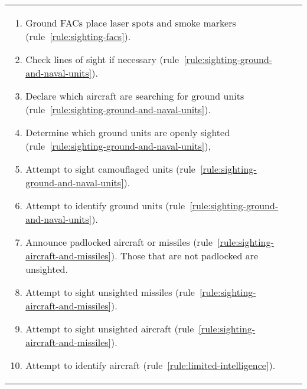 \begin{twocolumntable}
\begin{tabularx}{1.0\linewidth}{L@{\hspace{\columnsep}}L}
{\begin{enumerate}[topsep=0pt]
\begin{enumerate}[nosep]
    \item Ground FACs place laser spots and smoke markers (rule~\ref{rule:sighting-facs}).
    \item Check lines of sight if necessary (rule~\ref{rule:sighting-ground-and-naval-units}).
    \item Declare which aircraft are searching for ground units (rule~\ref{rule:sighting-ground-and-naval-units}).
    \item Determine which ground units are openly sighted (rule~\ref{rule:sighting-ground-and-naval-units}),
    \item Attempt to sight camouflaged units (rule~\ref{rule:sighting-ground-and-naval-units}).
    \item Attempt to identify ground units (rule~\ref{rule:sighting-ground-and-naval-units}).
    \item Announce padlocked aircraft or missiles (rule~\ref{rule:sighting-aircraft-and-missiles}). Those that are not padlocked are unsighted.
    \item Attempt to sight unsighted missiles (rule~\ref{rule:sighting-aircraft-and-missiles}).
    \item Attempt to sight unsighted aircraft (rule~\ref{rule:sighting-aircraft-and-missiles}).
    \item Attempt to identify aircraft (rule~\ref{rule:limited-intelligence}).
\end{enumerate}



\end{enumerate}}
\end{tabularx}
\end{twocolumntable}

